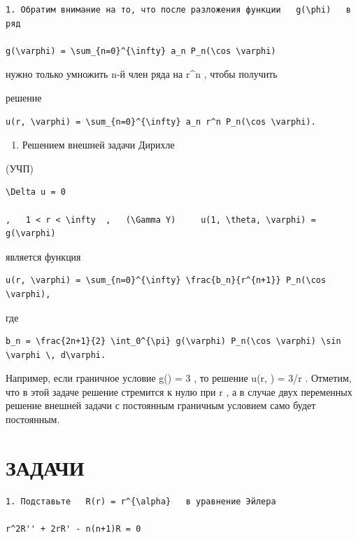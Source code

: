 \documentclass[
  ukrainian,
]{article}
\providecommand{\tightlist}{%
  \setlength{\itemsep}{0pt}\setlength{\parskip}{0pt}}
\begin{document}
\begin{verbatim}
1. Обратим внимание на то, что после разложения функции   g(\phi)   в ряд

g(\varphi) = \sum_{n=0}^{\infty} a_n P_n(\cos \varphi)
\end{verbatim}

нужно только умножить n-й член ряда на r\^{}n , чтобы получить

решение

\begin{verbatim}
u(r, \varphi) = \sum_{n=0}^{\infty} a_n r^n P_n(\cos \varphi).
\end{verbatim}

\begin{enumerate}
\def\labelenumi{\arabic{enumi}.}
\setcounter{enumi}{1}
\tightlist
\item
  Решением внешней задачи Дирихле
\end{enumerate}

(УЧП)

\begin{verbatim}
\Delta u = 0

,   1 < r < \infty  ,   (\Gamma Y)     u(1, \theta, \varphi) = g(\varphi)
\end{verbatim}

является функция

\begin{verbatim}
u(r, \varphi) = \sum_{n=0}^{\infty} \frac{b_n}{r^{n+1}} P_n(\cos \varphi),
\end{verbatim}

где

\begin{verbatim}
b_n = \frac{2n+1}{2} \int_0^{\pi} g(\varphi) P_n(\cos \varphi) \sin \varphi \, d\varphi.
\end{verbatim}

Например, если граничное условие g(\phi) = 3 , то решение u(r, \phi) =
3/r . Отметим, что в этой задаче решение стремится к нулю при r
\to \infty  , а в случае двух переменных решение внешней задачи с
постоянным граничным условием само будет постоянным.

\section{ЗАДАЧИ}\label{ux437ux430ux434ux430ux447ux438-14}

\begin{verbatim}
1. Подставьте   R(r) = r^{\alpha}   в уравнение Эйлера

r^2R'' + 2rR' - n(n+1)R = 0
\end{verbatim}
\end{document}
